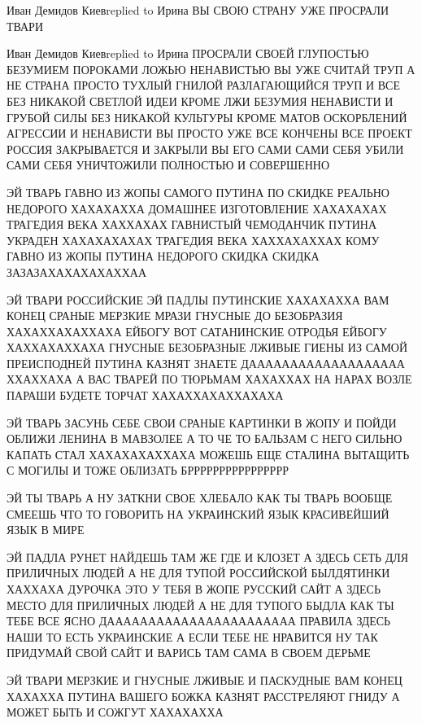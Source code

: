 Иван Демидов Киевreplied to Ирина
ВЫ СВОЮ СТРАНУ УЖЕ ПРОСРАЛИ ТВАРИ

Иван Демидов Киевreplied to Ирина
ПРОСРАЛИ СВОЕЙ ГЛУПОСТЬЮ БЕЗУМИЕМ ПОРОКАМИ ЛОЖЬЮ НЕНАВИСТЬЮ ВЫ УЖЕ СЧИТАЙ ТРУП А НЕ СТРАНА ПРОСТО ТУХЛЫЙ ГНИЛОЙ РАЗЛАГАЮЩИЙСЯ ТРУП И ВСЕ БЕЗ НИКАКОЙ СВЕТЛОЙ ИДЕИ КРОМЕ ЛЖИ БЕЗУМИЯ НЕНАВИСТИ И ГРУБОЙ СИЛЫ БЕЗ НИКАКОЙ КУЛЬТУРЫ КРОМЕ МАТОВ ОСКОРБЛЕНИЙ АГРЕССИИ И НЕНАВИСТИ ВЫ ПРОСТО УЖЕ ВСЕ КОНЧЕНЫ ВСЕ ПРОЕКТ РОССИЯ ЗАКРЫВАЕТСЯ И ЗАКРЫЛИ ВЫ ЕГО САМИ САМИ СЕБЯ УБИЛИ САМИ СЕБЯ УНИЧТОЖИЛИ ПОЛНОСТЬЮ И СОВЕРШЕННО




ЭЙ ТВАРЬ ГАВНО ИЗ ЖОПЫ САМОГО ПУТИНА ПО СКИДКЕ РЕАЛЬНО НЕДОРОГО ХАХАХАХХА
ДОМАШНЕЕ ИЗГОТОВЛЕНИЕ ХАХАХАХАХ ТРАГЕДИЯ ВЕКА ХАХХАХАХ ГАВНИСТЫЙ ЧЕМОДАНЧИК
ПУТИНА УКРАДЕН ХАХАХАХАХАХ ТРАГЕДИЯ ВЕКА ХАХХАХАХХАХ КОМУ ГАВНО ИЗ ЖОПЫ ПУТИНА
НЕДОРОГО СКИДКА СКИДКА ЗАЗАЗАХАХАХАХАХХАА

ЭЙ ТВАРИ РОССИЙСКИЕ ЭЙ ПАДЛЫ ПУТИНСКИЕ ХАХАХАХХА ВАМ КОНЕЦ СРАНЫЕ МЕРЗКИЕ МРАЗИ
ГНУСНЫЕ ДО БЕЗОБРАЗИЯ ХАХАХХАХАХХАХА ЕЙБОГУ ВОТ САТАНИНСКИЕ ОТРОДЬЯ ЕЙБОГУ
ХАХХАХАХХАХА ГНУСНЫЕ БЕЗОБРАЗНЫЕ ЛЖИВЫЕ ГИЕНЫ ИЗ САМОЙ ПРЕИСПОДНЕЙ ПУТИНА
КАЗНЯТ ЗНАЕТЕ ДААААААААААААААААААА ХХАХХАХА А ВАС ТВАРЕЙ ПО ТЮРЬМАМ ХАХАХХАХ НА
НАРАХ ВОЗЛЕ ПАРАШИ БУДЕТЕ ТОРЧАТ ХАХАХХАХАХХАХАХА

ЭЙ ТВАРЬ ЗАСУНЬ СЕБЕ СВОИ СРАНЫЕ КАРТИНКИ В ЖОПУ  И ПОЙДИ ОБЛИЖИ ЛЕНИНА В
МАВЗОЛЕЕ А ТО ЧЕ ТО БАЛЬЗАМ С НЕГО СИЛЬНО КАПАТЬ СТАЛ ХАХАХАХАХХАХА
МОЖЕШЬ ЕЩЕ СТАЛИНА ВЫТАЩИТЬ С МОГИЛЫ И ТОЖЕ ОБЛИЗАТЬ БРРРРРРРРРРРРРРРР

ЭЙ ТЫ ТВАРЬ А НУ ЗАТКНИ СВОЕ ХЛЕБАЛО КАК ТЫ ТВАРЬ ВООБЩЕ СМЕЕШЬ ЧТО ТО ГОВОРИТЬ
НА УКРАИНСКИЙ ЯЗЫК КРАСИВЕЙШИЙ ЯЗЫК В МИРЕ

ЭЙ ПАДЛА РУНЕТ НАЙДЕШЬ ТАМ ЖЕ ГДЕ И КЛОЗЕТ А ЗДЕСЬ СЕТЬ ДЛЯ ПРИЛИЧНЫХ ЛЮДЕЙ А
НЕ ДЛЯ ТУПОЙ РОССИЙСКОЙ БЫЛДЯТИНКИ ХАХХАХА ДУРОЧКА ЭТО У ТЕБЯ В ЖОПЕ РУССКИЙ
САЙТ А ЗДЕСЬ МЕСТО ДЛЯ ПРИЛИЧНЫХ ЛЮДЕЙ А НЕ ДЛЯ ТУПОГО БЫДЛА КАК ТЫ ТЕБЕ ВСЕ
ЯСНО ДААААААААААААААААААААААА ПРАВИЛА ЗДЕСЬ НАШИ ТО ЕСТЬ УКРАИНСКИЕ А ЕСЛИ ТЕБЕ
НЕ НРАВИТСЯ НУ ТАК ПРИДУМАЙ СВОЙ САЙТ И ВАРИСЬ ТАМ САМА В СВОЕМ ДЕРЬМЕ

ЭЙ ТВАРИ МЕРЗКИЕ И ГНУСНЫЕ ЛЖИВЫЕ И ПАСКУДНЫЕ ВАМ КОНЕЦ ХАХАХХА ПУТИНА ВАШЕГО
БОЖКА КАЗНЯТ РАССТРЕЛЯЮТ ГНИДУ А МОЖЕТ БЫТЬ И СОЖГУТ ХАХАХАХХА



